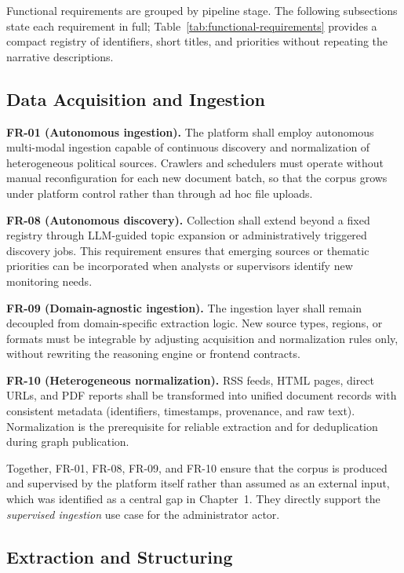 Functional requirements are grouped by pipeline stage. The following subsections state each requirement in full; Table~\ref{tab:functional-requirements} provides a compact registry of identifiers, short titles, and priorities without repeating the narrative descriptions.

\subsection{Data Acquisition and Ingestion}

\textbf{FR-01 (Autonomous ingestion).} The platform shall employ autonomous multi-modal ingestion capable of continuous discovery and normalization of heterogeneous political sources. Crawlers and schedulers must operate without manual reconfiguration for each new document batch, so that the corpus grows under platform control rather than through ad hoc file uploads.

\textbf{FR-08 (Autonomous discovery).} Collection shall extend beyond a fixed registry through LLM-guided topic expansion or administratively triggered discovery jobs. This requirement ensures that emerging sources or thematic priorities can be incorporated when analysts or supervisors identify new monitoring needs.

\textbf{FR-09 (Domain-agnostic ingestion).} The ingestion layer shall remain decoupled from domain-specific extraction logic. New source types, regions, or formats must be integrable by adjusting acquisition and normalization rules only, without rewriting the reasoning engine or frontend contracts.

\textbf{FR-10 (Heterogeneous normalization).} RSS feeds, HTML pages, direct URLs, and PDF reports shall be transformed into unified document records with consistent metadata (identifiers, timestamps, provenance, and raw text). Normalization is the prerequisite for reliable extraction and for deduplication during graph publication.

Together, FR-01, FR-08, FR-09, and FR-10 ensure that the corpus is produced and supervised by the platform itself rather than assumed as an external input, which was identified as a central gap in Chapter~1. They directly support the \emph{supervised ingestion} use case for the administrator actor.

\subsection{Extraction and Structuring}

